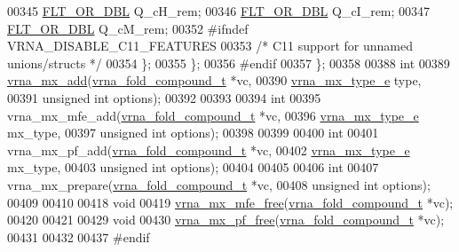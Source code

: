 \begin{DoxyCode}
00345   \hyperlink{group__data__structures_ga31125aeace516926bf7f251f759b6126}{FLT\_OR\_DBL} Q\_cH\_rem;
00346   \hyperlink{group__data__structures_ga31125aeace516926bf7f251f759b6126}{FLT\_OR\_DBL} Q\_cI\_rem;
00347   \hyperlink{group__data__structures_ga31125aeace516926bf7f251f759b6126}{FLT\_OR\_DBL} Q\_cM\_rem;
00352 \textcolor{preprocessor}{#ifndef VRNA\_DISABLE\_C11\_FEATURES}
00353   \textcolor{comment}{/* C11 support for unnamed unions/structs */}
00354 \};
00355 \};
00356 \textcolor{preprocessor}{#endif}
00357 \};
00358 
00388 \textcolor{keywordtype}{int}
00389 \hyperlink{group__dp__matrices_ga08661f098008961dab0023bf300f0c33}{vrna\_mx\_add}(\hyperlink{group__fold__compound_structvrna__fc__s}{vrna\_fold\_compound\_t}  *vc,
00390             \hyperlink{group__dp__matrices_ga6042ea1d58d01931e959791be6d89343}{vrna\_mx\_type\_e}        type,
00391             \textcolor{keywordtype}{unsigned} \textcolor{keywordtype}{int}          options);
00392 
00393 
00394 \textcolor{keywordtype}{int}
00395 vrna\_mx\_mfe\_add(\hyperlink{group__fold__compound_structvrna__fc__s}{vrna\_fold\_compound\_t}  *vc,
00396                 \hyperlink{group__dp__matrices_ga6042ea1d58d01931e959791be6d89343}{vrna\_mx\_type\_e}        mx\_type,
00397                 \textcolor{keywordtype}{unsigned} \textcolor{keywordtype}{int}          options);
00398 
00399 
00400 \textcolor{keywordtype}{int}
00401 vrna\_mx\_pf\_add(\hyperlink{group__fold__compound_structvrna__fc__s}{vrna\_fold\_compound\_t} *vc,
00402                \hyperlink{group__dp__matrices_ga6042ea1d58d01931e959791be6d89343}{vrna\_mx\_type\_e}       mx\_type,
00403                \textcolor{keywordtype}{unsigned} \textcolor{keywordtype}{int}         options);
00404 
00405 
00406 \textcolor{keywordtype}{int}
00407 vrna\_mx\_prepare(\hyperlink{group__fold__compound_structvrna__fc__s}{vrna\_fold\_compound\_t}  *vc,
00408                 \textcolor{keywordtype}{unsigned} \textcolor{keywordtype}{int}          options);
00409 
00410 
00418 \textcolor{keywordtype}{void}
00419 \hyperlink{group__dp__matrices_ga6a9422feb5dfe5c64050cebf447672d0}{vrna\_mx\_mfe\_free}(\hyperlink{group__fold__compound_structvrna__fc__s}{vrna\_fold\_compound\_t} *vc);
00420 
00421 
00429 \textcolor{keywordtype}{void}
00430 \hyperlink{group__dp__matrices_ga2283e69fd139fb8e58d7ade3b5773f9c}{vrna\_mx\_pf\_free}(\hyperlink{group__fold__compound_structvrna__fc__s}{vrna\_fold\_compound\_t} *vc);
00431 
00432 
00437 \textcolor{preprocessor}{#endif}
\end{DoxyCode}
